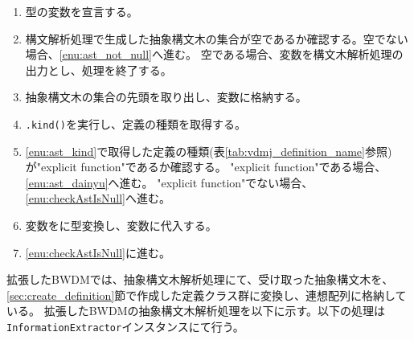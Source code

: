 \documentclass[uplatex, report, a4j, 10pt]{jsbook}
\newcommand\ttt[1]{\texttt{#1}}
\begin{document}

\begin{enumerate}
  \item \TCExplicitFunctionDefinition{}型の変数\tcFunctionDefinition{}を宣言する。
  \item\label{enu:checkAstIsNull} 構文解析処理で生成した抽象構文木の集合が空であるか確認する。空でない場合、\ref{enu:ast_not_null}へ進む。
        空である場合、変数\tcFunctionDefinition{}を構文木解析処理の出力とし、処理を終了する。
  \item\label{enu:ast_not_null} 抽象構文木の集合の先頭を取り出し、変数\astDefinition{}に格納する。
  \item\label{enu:ast_kind} \astDefinition{}\ttt{.kind()}を実行し、定義の種類を取得する。
  \item \ref{enu:ast_kind}で取得した定義の種類(表\ref{tab:vdmj_definition_name}参照)が"explicit function"であるか確認する。
        "explicit function"である場合、\ref{enu:ast_dainyu}へ進む。
        "explicit function"でない場合、\ref{enu:checkAstIsNull}へ進む。
  \item\label{enu:ast_dainyu} 変数\astDefinition{}を\TCExplicitFunctionDefinition{}に型変換し、変数\tcFunctionDefinition{}に代入する。
  \item \ref{enu:checkAstIsNull}に進む。
\end{enumerate}


拡張したBWDMでは、抽象構文木解析処理にて、受け取った抽象構文木を、\ref{sec:create_definition}節で作成した定義クラス群に変換し、連想配列に格納している。
拡張したBWDMの抽象構文木解析処理を以下に示す。以下の処理は\ttt{InformationExtractor}インスタンスにて行う。
\end{document}
